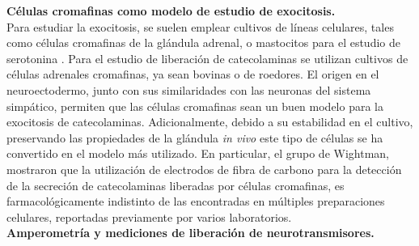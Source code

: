 \documentclass[twocolumn]{article}
\begin{document}
{\bf Células cromafinas como modelo de estudio de exocitosis.\\}
Para estudiar la exocitosis, se suelen emplear cultivos de líneas celulares\citep{O'Neill-1994}, tales como células cromafinas de la glándula adrenal\citep{bader2002exocytosis,wightman1991temporally},  o mastocitos para el estudio de serotonina\citep{reynier1997ne} . 
Para el estudio de liberación de catecolaminas se utilizan cultivos de células adrenales cromafinas, ya sean bovinas o de roedores. El origen en el neuroectodermo, junto con sus similaridades con las neuronas del sistema simpático, permiten que las células cromafinas sean un buen modelo para la exocitosis de catecolaminas.  Adicionalmente, debido a su estabilidad en el cultivo, preservando  las propiedades de la glándula \textit{in vivo} este tipo de células se ha convertido en el modelo más utilizado\citep{bader2002exocytosis,leszczyszyn1991secretion,wightman1991temporally}.
En particular, el grupo de Wightman\citep{leszczyszyn1990nicotinic,leszczyszyn1991secretion}, mostraron que la utilización de electrodos de fibra de carbono para la detección de la secreción de catecolaminas liberadas por células cromafinas, es farmacológicamente indistinto de las encontradas en múltiples preparaciones celulares, reportadas previamente por varios laboratorios\citep{phillips1983visualization,viveros1969quantal}.\\
{\bf Amperometría y mediciones de liberación de neurotransmisores.\\}
\end{document}
